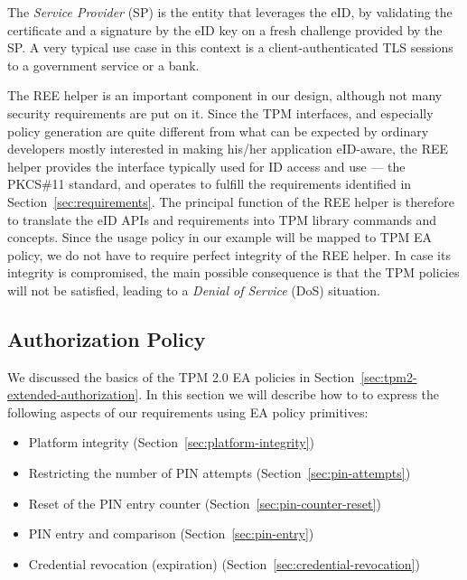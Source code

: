 \documentclass{sig-alternate-2013}
\begin{document}
The \emph{Service Provider} (SP) is the entity that leverages the eID, by
validating the certificate and a signature by the eID key on a fresh challenge
provided by the SP\@. A very typical use case in this context is a
client-authenticated TLS sessions to a government service or a
bank\footnotemark.


The REE helper is an important component in our design, although not many
security requirements are put on it. Since the TPM interfaces, and especially
policy generation are quite different from what can be expected by ordinary
developers mostly interested in making his/her application eID-aware, the REE
helper provides the interface typically used for ID access and use --- the
PKCS\#11 standard, and operates to fulfill the requirements identified in
Section~\ref{sec:requirements}. The principal function of the REE helper is
therefore to translate the eID APIs and requirements into TPM library commands
and concepts. Since the usage policy in our example will be mapped to TPM EA
policy, we do not have to require perfect integrity of the REE helper. In case
its integrity is compromised, the main possible consequence is that the TPM
policies will not be satisfied, leading to a \emph{Denial of Service} (DoS)
situation.

\subsection{Authorization Policy}
\label{sec:authorization-policy}

We discussed the basics of the TPM 2.0 EA policies in
Section~\ref{sec:tpm2-extended-authorization}. In this section we will describe
how to to express the following aspects of our requirements using EA policy
primitives:

\begin{itemize}
  \item Platform integrity \hfill (Section~\ref{sec:platform-integrity})
  \item Restricting the number of PIN attempts \hfill (Section~\ref{sec:pin-attempts})
  \item Reset of the PIN entry counter \hfill (Section~\ref{sec:pin-counter-reset})
  \item PIN entry and comparison \hfill (Section~\ref{sec:pin-entry})
  \item Credential revocation (expiration) \hfill (Section~\ref{sec:credential-revocation})
\end{itemize}
\end{document}
